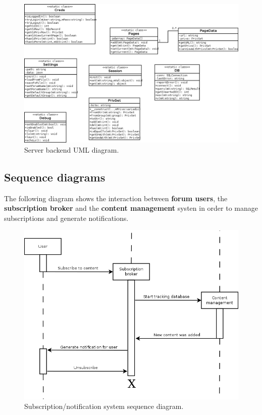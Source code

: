 \documentclass[12pt]{report}
\renewcommand\emph{\textbf}
\begin{document}
                    \newpage

                    \begin{figure}[H]
                    \caption{Server backend UML diagram.}
                    \centering
                    \includegraphics[width=1\textwidth]{uml/umlphp}
                    \end{figure}

                    \newpage
                    \newpage

                \subsection{Sequence diagrams}                    

                    The following diagram shows the interaction between \emph{forum users}, the \emph{subscription broker} and the \emph{content management} systen in order to manage subscriptions and generate notifications.

                    \begin{figure}[H]
                    \caption{Subscription/notification system sequence diagram.}
                    \centering
                    \includegraphics[width=1\textwidth]{uc/s1}
                    \end{figure}
\end{document}
